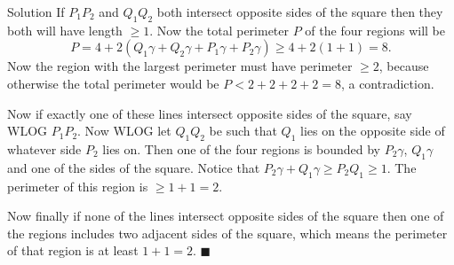 \documentclass{article}
\begin{document}
\begin{solution}{Solution}
If $P_1 P_2$ and $Q_1 Q_2$ both intersect opposite sides of the square
then they both will have length $ \geq 1$. Now the total perimeter $P$ of
the four regions will be
$$
P = 4 + 2(Q_1 \gamma + Q_2 \gamma + P_1 \gamma + P_2 \gamma)
\geq 4 + 2(1+1) = 8.
$$
Now the region with the largest perimeter must have perimeter $\geq 2$,
because otherwise the total perimeter would be $P < 2+2+2+2 = 8$, a
contradiction.\vspace{0.2cm}

Now if exactly one of these lines intersect opposite sides of the square,
say WLOG $P_1 P_2$. Now WLOG let $Q_1 Q_2$ be such that $Q_1$ lies on the
opposite side of whatever side $P_2$ lies on.
Then one of the four regions is bounded by
$P_2 \gamma$, $Q_1 \gamma$ and one of the sides of the square.
Notice that $P_2 \gamma + Q_1 \gamma \geq P_2 Q_1 \geq 1$.
The perimeter
of this region is $\geq 1+1 = 2$. \vspace{0.2cm}

Now finally if none of the lines intersect opposite sides of the square
then one of the regions includes two adjacent sides of the square, which
means the perimeter of that region is at least $1+1=2$. $\blacksquare$
\end{solution}
\end{document}
